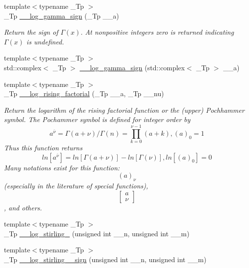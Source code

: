 \begin{DoxyCompactItemize}
{\footnotesize template$<$typename \+\_\+\+Tp $>$ }\\\+\_\+\+Tp \hyperlink{namespacestd_1_1____detail_ab17ef141874b20a302d5c142cf304542}{\+\_\+\+\_\+log\+\_\+gamma\+\_\+sign} (\+\_\+\+Tp \+\_\+\+\_\+a)
\begin{DoxyCompactList}\small\item\em Return the sign of $ \Gamma(x) $. At nonpositive integers zero is returned indicating $ \Gamma(x) $ is undefined. \end{DoxyCompactList}\item 
{\footnotesize template$<$typename \+\_\+\+Tp $>$ }\\std\+::complex$<$ \+\_\+\+Tp $>$ \hyperlink{namespacestd_1_1____detail_a4c87b679d9fa1ac20ebe3cb85becb266}{\+\_\+\+\_\+log\+\_\+gamma\+\_\+sign} (std\+::complex$<$ \+\_\+\+Tp $>$ \+\_\+\+\_\+a)
\item 
{\footnotesize template$<$typename \+\_\+\+Tp $>$ }\\\+\_\+\+Tp \hyperlink{namespacestd_1_1____detail_a48998bae6619c9f63574af354b205074}{\+\_\+\+\_\+log\+\_\+rising\+\_\+factorial} (\+\_\+\+Tp \+\_\+\+\_\+a, \+\_\+\+Tp \+\_\+\+\_\+nu)
\begin{DoxyCompactList}\small\item\em Return the logarithm of the rising factorial function or the (upper) Pochhammer symbol. The Pochammer symbol is defined for integer order by \[ a^{\overline{\nu}} = \Gamma(a + \nu) / \Gamma(n) = \prod_{k=0}^{\nu-1} (a + k), (a)_0 = 1 \] Thus this function returns \[ ln[a^{\overline{\nu}}] = ln[\Gamma(a + \nu)] - ln[\Gamma(\nu)], ln[(a)_0] = 0 \] Many notations exist for this function\+: \[ (a)_\nu \] (especially in the literature of special functions), \[ \left[ \begin{array}{c} a \\ \nu \end{array} \right] \], and others. \end{DoxyCompactList}\item 
{\footnotesize template$<$typename \+\_\+\+Tp $>$ }\\\+\_\+\+Tp \hyperlink{namespacestd_1_1____detail_a4924c5c0666c33328d6276b5dbbdfad5}{\+\_\+\+\_\+log\+\_\+stirling\+\_} (unsigned int \+\_\+\+\_\+n, unsigned int \+\_\+\+\_\+m)
\item 
{\footnotesize template$<$typename \+\_\+\+Tp $>$ }\\\+\_\+\+Tp \hyperlink{namespacestd_1_1____detail_af804ed0eecfca835d1338a48892460b0}{\+\_\+\+\_\+log\+\_\+stirling\+\_\+\_\+sign} (unsigned int \+\_\+\+\_\+n, unsigned int \+\_\+\+\_\+m)

\end{DoxyCompactItemize}
